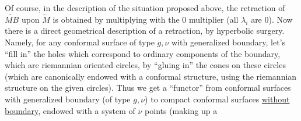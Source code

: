 Of course, in the description of the situation proposed above, the retraction of $\widetilde{MB}$ upon $\widetilde M$ is obtained by multiplying with the $0$ multiplier (all $\lambda_i$ are $0$). Now there is a direct geometrical description of  a retraction, by hyperbolic surgery. Namely, for any  conformal surface of type $g,\nu$ with generalized boundary, let's ``fill in'' the holes which correspond to ordinary components of the boundary, which are riemannian oriented circles, by ``gluing in'' the cones on these circles (which are canonically endowed with a conformal structure, using the riemannian structure on the given circles). Thus we get a ``functor'' from  conformal surfaces with generalized boundary (of type $g,\nu$) to compact conformal surfaces \uline{without boundary}, endowed with a system of $\nu$ points (making up a
